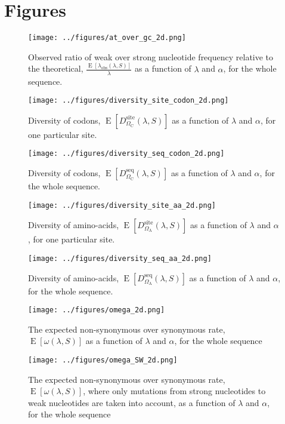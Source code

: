 \documentclass{article}
\newcommand{\SetCodon}{\Omega_{\mathrm{C}}}
\newcommand{\SetAa}{\Omega_{\mathrm{A}}}
\begin{document}
    
    
    
	\section{Figures}
   	\begin{figure*}[!ht]
		\centering
		\texttt{[image: ../figures/at\_over\_gc\_2d.png]}
		\caption{Observed ratio of weak over strong nucleotide frequency relative to the theoretical, $\frac{\operatorname{E} [\lambda_{\mathrm{obs}}(\lambda, S)]}{\lambda}$ as a function of $\lambda$ and $\alpha$, for the whole sequence.}
	\end{figure*}
   	\begin{figure*}[!ht]
		\centering
		\texttt{[image: ../figures/diversity\_site\_codon\_2d.png]}
		\caption{Diversity of codons, $\operatorname{E} [D_{\SetCodon}^{\mathrm{site}}(\lambda, S)]$ as a function of $\lambda$ and $\alpha$, for one particular site.}
	\end{figure*}
	\begin{figure*}[!ht]
		\centering
		\texttt{[image: ../figures/diversity\_seq\_codon\_2d.png]}
		\caption{Diversity of codons, $\operatorname{E} [D_{\SetCodon}^{\mathrm{seq}}(\lambda, S)]$ as a function of $\lambda$ and $\alpha$, for the whole sequence.}
	\end{figure*}
	\begin{figure*}[!ht]
		\centering
		\texttt{[image: ../figures/diversity\_site\_aa\_2d.png]}
		\caption{Diversity of amino-acids, $\operatorname{E} [D_{\SetAa}^{\mathrm{site}}(\lambda, S)]$ as a function of $\lambda$ and $\alpha$, for one particular site.}
	\end{figure*}
	\begin{figure*}[!ht]
		\centering
		\texttt{[image: ../figures/diversity\_seq\_aa\_2d.png]}
		\caption{Diversity of amino-acids, $\operatorname{E} [D_{\SetAa}^{\mathrm{seq}}(\lambda, S)]$ as a function of $\lambda$ and $\alpha$, for the whole sequence.}
	\end{figure*}
	\begin{figure*}[!ht]
	\centering
	\texttt{[image: ../figures/omega\_2d.png]}
	\caption{The expected non-synonymous over synonymous rate, $\operatorname{E} [\omega(\lambda, S)]$ as a function of $\lambda$ and $\alpha$, for the whole sequence}
	\end{figure*}
	\begin{figure*}[!ht]
	\centering
	\texttt{[image: ../figures/omega\_SW\_2d.png]}
	\caption{The expected non-synonymous over synonymous rate, $\operatorname{E} [\omega(\lambda, S)]$, where only mutations from strong nucleotides to weak nucleotides are taken into account, as a function of $\lambda$ and $\alpha$, for the whole sequence}
\end{figure*}
\end{document}

